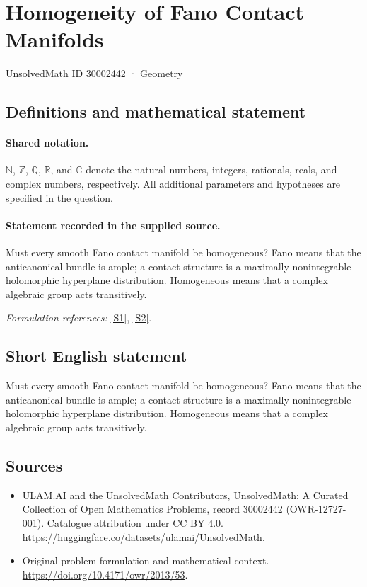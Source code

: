 \documentclass[11pt]{article}
\newcommand{\sref}[2]{\hyperlink{source:#1:#2}{[S#2]}}
\begin{document}
\setcounter{section}{30002441}
\section{Homogeneity of Fano Contact Manifolds}\label{30002442}
{\small UnsolvedMath ID 30002442 · Geometry}
\subsection{Definitions and mathematical statement}

\paragraph{Shared notation.}$\mathbb N$, $\mathbb Z$, $\mathbb Q$, $\mathbb R$, and $\mathbb C$ denote the natural numbers, integers, rationals, reals, and complex numbers, respectively. All additional parameters and hypotheses are specified in the question.


\paragraph{Statement recorded in the supplied source.}
Must every smooth Fano contact manifold be homogeneous? Fano means that the anticanonical bundle is ample; a contact structure is a maximally nonintegrable holomorphic hyperplane distribution. Homogeneous means that a complex algebraic group acts transitively.
\par\smallskip\textit{Formulation references:} \sref{30002442}{1}, \sref{30002442}{2}.
\subsection{Short English statement}
Must every smooth Fano contact manifold be homogeneous? Fano means that the anticanonical bundle is ample; a contact structure is a maximally nonintegrable holomorphic hyperplane distribution. Homogeneous means that a complex algebraic group acts transitively.
\subsection{Sources}
\begin{itemize}
\item[\hypertarget{source:30002442:1}{S1}] ULAM.AI and the UnsolvedMath Contributors, UnsolvedMath: A Curated Collection of Open Mathematics Problems, record 30002442 (OWR-12727-001). Catalogue attribution under CC BY 4.0.
\url{https://huggingface.co/datasets/ulamai/UnsolvedMath}.
\item[\hypertarget{source:30002442:2}{S2}] Original problem formulation and mathematical context.
\url{https://doi.org/10.4171/owr/2013/53}.
\end{itemize}
\label{end:30002442}
\end{document}

